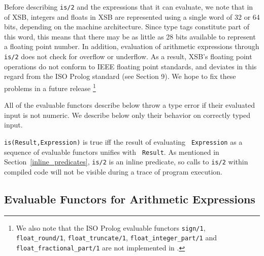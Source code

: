 Before describing {\tt is/2} and the expressions that it can evaluate,
we note that in \version{} of XSB, integers and floats in XSB are
represented using a single word of 32 or 64 bits, depending on the
machine architecture.  Since type tags constitute part of this word,
this means that there may be as little as 28 bits available to
represent a floating point number.  In addition, evaluation of
arithmetic expressions through {\tt is/2} does not check for overflow
or underflow.  As a result, XSB's floating point operations do not
conform to IEEE floating point standards, and deviates in this regard
from the ISO Prolog standard (see \cite{ISO-Prolog} Section 9).  We
hope to fix these problems in a future release \footnote{We also note
that the ISO Prolog evaluable functors {\tt sign/1}, {\tt
float\_round/1}, {\tt float\_truncate/1}, {\tt float\_integer\_part/1}
and {\tt float\_fractional\_part/1} are not implemented in \version .}

All of the evaluable functors describe below throw a type error if
their evaluated input is not numeric.  We describe below only their
behavior on correctly typed input.

\begin{description}
{\tt is(Result,Expression)} is true iff the result of evaluating {\tt
Expression} as a sequence of evaluable functors unifies with {\tt
Result}.  As mentioned in Section~\ref{inline_predicates}, {\tt is/2}
is an inline predicate, so calls to {\tt is/2} within compiled code
will not be visible during a trace of program execution.
\end{description}

\subsection{Evaluable Functors for Arithmetic Expressions}

